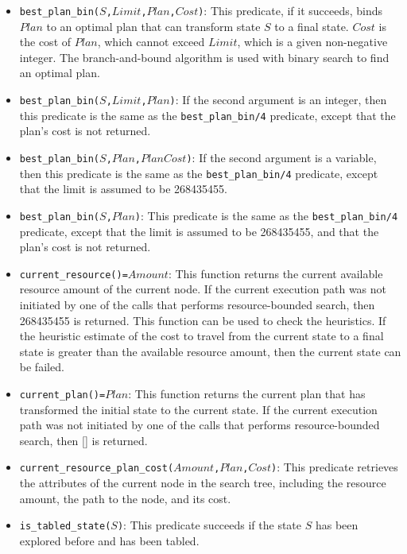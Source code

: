 \begin{itemize}
\item \texttt{best\_plan\_bin($S$,$Limit$,$Plan$,$Cost$)}: 
This predicate, if it succeeds, binds $Plan$ to an optimal plan that can transform state $S$ to a final state. $Cost$ is the cost of $Plan$, which cannot exceed $Limit$, which is a given non-negative integer. The branch-and-bound algorithm is used with binary search to find an optimal plan.

\item \texttt{best\_plan\_bin($S$,$Limit$,$Plan$)}: If the second argument is an integer, then this predicate is the same as the \texttt{best\_plan\_bin/4} predicate, except that the plan's cost is not returned. 

\item \texttt{best\_plan\_bin($S$,$Plan$,$PlanCost$)}: If the second argument is a variable, then this predicate is the same as the \texttt{best\_plan\_bin/4} predicate, except that the limit is assumed to be 268435455.

\item \texttt{best\_plan\_bin($S$,$Plan$)}: 
This predicate is the same as the \texttt{best\_plan\_bin/4} predicate, except that the limit is assumed to be 268435455, and that the plan's cost is not returned.

\item \texttt{current\_resource()=$Amount$}: This function returns the current available resource amount of the current node. If the current execution path was not initiated by one of the calls that performs resource-bounded search, then 268435455 is returned. This function can be used to check the heuristics. If the heuristic estimate of the cost to travel from the current state to a final state is greater than the available resource amount, then the current state can be failed.

\item \texttt{current\_plan()=$Plan$}: This function returns the current plan that has transformed the initial state to the current state. If the current execution path was not initiated by one of the calls that performs resource-bounded search, then [] is returned.

\item \texttt{current\_resource\_plan\_cost($Amount$,$Plan$,$Cost$)}: This predicate retrieves the attributes of the current node in the search tree, including the resource amount, the path to the node, and its cost.

\item \texttt{is\_tabled\_state($S$)}: This predicate succeeds if the state $S$ has been explored before and has been tabled.
\end{itemize}

